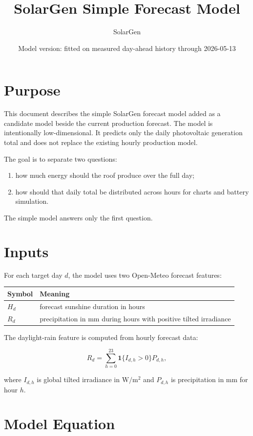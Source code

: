 \documentclass[11pt,a4paper]{article}
\title{SolarGen Simple Forecast Model}
\author{SolarGen}
\date{Model version: fitted on measured day-ahead history through 2026-05-13}
\begin{document}
\maketitle

\section{Purpose}

This document describes the simple SolarGen forecast model added as a candidate model beside the current production forecast. The model is intentionally low-dimensional. It predicts only the daily photovoltaic generation total and does not replace the existing hourly production model.

The goal is to separate two questions:

\begin{enumerate}
  \item how much energy should the roof produce over the full day;
  \item how should that daily total be distributed across hours for charts and battery simulation.
\end{enumerate}

The simple model answers only the first question.

\section{Inputs}

For each target day \(d\), the model uses two Open-Meteo forecast features:

\begin{center}
\begin{tabular}{ll}
\toprule
Symbol & Meaning \\
\midrule
\(H_d\) & forecast sunshine duration in hours \\
\(R_d\) & precipitation in mm during hours with positive tilted irradiance \\
\bottomrule
\end{tabular}
\end{center}

The daylight-rain feature is computed from hourly forecast data:

\[
R_d =
\sum_{h=0}^{23}
\mathbf{1}\{I_{d,h} > 0\} P_{d,h},
\]

where \(I_{d,h}\) is global tilted irradiance in \(\mathrm{W/m^2}\) and \(P_{d,h}\) is precipitation in mm for hour \(h\).

\section{Model Equation}
\end{document}
